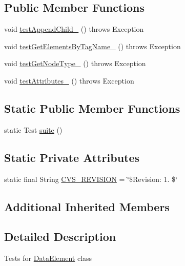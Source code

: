 \subsection*{Public Member Functions}
\begin{DoxyCompactItemize}
\item 
void \hyperlink{classorg_1_1jgap_1_1data_1_1_data_element_test_a50c008cfcf79a322a054d7cab78cd102}{test\-Append\-Child\-\_} ()  throws Exception 
\item 
void \hyperlink{classorg_1_1jgap_1_1data_1_1_data_element_test_aa30ba92e4ad7589d970b6cb65d238048}{test\-Get\-Elements\-By\-Tag\-Name\-\_} ()  throws Exception 
\item 
void \hyperlink{classorg_1_1jgap_1_1data_1_1_data_element_test_aa47569a52b666db2f5392f1e91ad06f2}{test\-Get\-Node\-Type\-\_} ()  throws Exception 
\item 
void \hyperlink{classorg_1_1jgap_1_1data_1_1_data_element_test_a64bb2daed087d57cfe6942ec7cdd79c4}{test\-Attributes\-\_} ()  throws Exception 
\end{DoxyCompactItemize}
\subsection*{Static Public Member Functions}
\begin{DoxyCompactItemize}
\item 
static Test \hyperlink{classorg_1_1jgap_1_1data_1_1_data_element_test_a45c40ad1bc90fbd9e578d763a4f67b16}{suite} ()
\end{DoxyCompactItemize}
\subsection*{Static Private Attributes}
\begin{DoxyCompactItemize}
\item 
static final String \hyperlink{classorg_1_1jgap_1_1data_1_1_data_element_test_a1273c7f36f4364768756edeb78d0eaa8}{C\-V\-S\-\_\-\-R\-E\-V\-I\-S\-I\-O\-N} = \char`\"{}\$Revision\-: 1. \$\char`\"{}
\end{DoxyCompactItemize}
\subsection*{Additional Inherited Members}


\subsection{Detailed Description}
Tests for \hyperlink{classorg_1_1jgap_1_1data_1_1_data_element}{Data\-Element} class

